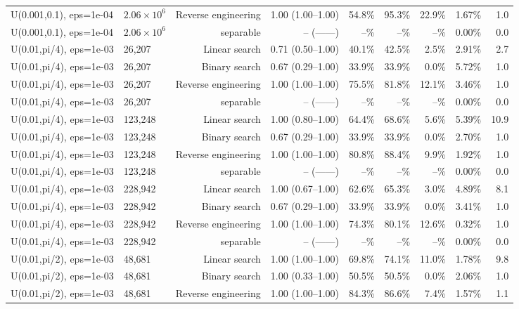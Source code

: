 \begin{tabular}{llrrrrrrr}
U(0.001,0.1), eps=1e-04 & $2.06\times 10^{6}$ & Reverse engineering & 1.00 (1.00--1.00) & 54.8\% & 95.3\% & 22.9\% & 1.67\% & 1.0 \\
U(0.001,0.1), eps=1e-04 & $2.06\times 10^{6}$ & separable & -- (------) & --\% & --\% & --\% & 0.00\% & 0.0 \\
U(0.01,pi/4), eps=1e-03 & 26,207 & Linear search & 0.71 (0.50--1.00) & 40.1\% & 42.5\% & 2.5\% & 2.91\% & 2.7 \\
U(0.01,pi/4), eps=1e-03 & 26,207 & Binary search & 0.67 (0.29--1.00) & 33.9\% & 33.9\% & 0.0\% & 5.72\% & 1.0 \\
U(0.01,pi/4), eps=1e-03 & 26,207 & Reverse engineering & 1.00 (1.00--1.00) & 75.5\% & 81.8\% & 12.1\% & 3.46\% & 1.0 \\
U(0.01,pi/4), eps=1e-03 & 26,207 & separable & -- (------) & --\% & --\% & --\% & 0.00\% & 0.0 \\
U(0.01,pi/4), eps=1e-03 & 123,248 & Linear search & 1.00 (0.80--1.00) & 64.4\% & 68.6\% & 5.6\% & 5.39\% & 10.9 \\
U(0.01,pi/4), eps=1e-03 & 123,248 & Binary search & 0.67 (0.29--1.00) & 33.9\% & 33.9\% & 0.0\% & 2.70\% & 1.0 \\
U(0.01,pi/4), eps=1e-03 & 123,248 & Reverse engineering & 1.00 (1.00--1.00) & 80.8\% & 88.4\% & 9.9\% & 1.92\% & 1.0 \\
U(0.01,pi/4), eps=1e-03 & 123,248 & separable & -- (------) & --\% & --\% & --\% & 0.00\% & 0.0 \\
U(0.01,pi/4), eps=1e-03 & 228,942 & Linear search & 1.00 (0.67--1.00) & 62.6\% & 65.3\% & 3.0\% & 4.89\% & 8.1 \\
U(0.01,pi/4), eps=1e-03 & 228,942 & Binary search & 0.67 (0.29--1.00) & 33.9\% & 33.9\% & 0.0\% & 3.41\% & 1.0 \\
U(0.01,pi/4), eps=1e-03 & 228,942 & Reverse engineering & 1.00 (1.00--1.00) & 74.3\% & 80.1\% & 12.6\% & 0.32\% & 1.0 \\
U(0.01,pi/4), eps=1e-03 & 228,942 & separable & -- (------) & --\% & --\% & --\% & 0.00\% & 0.0 \\
U(0.01,pi/2), eps=1e-03 & 48,681 & Linear search & 1.00 (1.00--1.00) & 69.8\% & 74.1\% & 11.0\% & 1.78\% & 9.8 \\
U(0.01,pi/2), eps=1e-03 & 48,681 & Binary search & 1.00 (0.33--1.00) & 50.5\% & 50.5\% & 0.0\% & 2.06\% & 1.0 \\
U(0.01,pi/2), eps=1e-03 & 48,681 & Reverse engineering & 1.00 (1.00--1.00) & 84.3\% & 86.6\% & 7.4\% & 1.57\% & 1.1 \\

\end{tabular}
